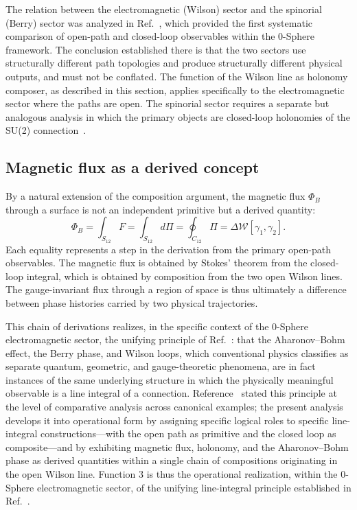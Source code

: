 \documentclass[%
 reprint, amsmath,amssymb, aps, prb, ]{revtex4-2}
\numberwithin{equation}{section}
\newcommand{\WL}{\mathcal{W}}
\begin{document}
The relation between the electromagnetic (Wilson) sector and the spinorial (Berry) sector was analyzed in Ref.~\cite{hanamura43}, which provided the first systematic comparison of open-path and closed-loop observables within the 0-Sphere framework. The conclusion established there is that the two sectors use structurally different path topologies and produce structurally different physical outputs, and must not be conflated. The function of the Wilson line as holonomy composer, as described in this section, applies specifically to the electromagnetic sector where the paths are open. The spinorial sector requires a separate but analogous analysis in which the primary objects are closed-loop holonomies of the SU(2) connection~\cite{hanamura45}.

\subsection{Magnetic flux as a derived concept}

By a natural extension of the composition argument, the magnetic flux $\Phi_B$ through a surface is not an independent primitive but a derived quantity:
\begin{equation}
\Phi_B = \int_{S_{12}} F = \int_{S_{12}} d\Pi = \oint_{C_{12}} \Pi = \Delta\WL[\gamma_1, \gamma_2].
\label{eq:flux_derived}
\end{equation}
Each equality represents a step in the derivation from the primary open-path observables. The magnetic flux is obtained by Stokes' theorem from the closed-loop integral, which is obtained by composition from the two open Wilson lines. The gauge-invariant flux through a region of space is thus ultimately a difference between phase histories carried by two physical trajectories.

This chain of derivations realizes, in the specific context of the 0-Sphere electromagnetic sector, the unifying principle of Ref.~\cite{hanamura31}: that the Aharonov--Bohm effect, the Berry phase, and Wilson loops, which conventional physics classifies as separate quantum, geometric, and gauge-theoretic phenomena, are in fact instances of the same underlying structure in which the physically meaningful observable is a line integral of a connection. Reference~\cite{hanamura31} stated this principle at the level of comparative analysis across canonical examples; the present analysis develops it into operational form by assigning specific logical roles to specific line-integral constructions---with the open path as primitive and the closed loop as composite---and by exhibiting magnetic flux, holonomy, and the Aharonov--Bohm phase as derived quantities within a single chain of compositions originating in the open Wilson line. Function 3 is thus the operational realization, within the 0-Sphere electromagnetic sector, of the unifying line-integral principle established in Ref.~\cite{hanamura31}.
\end{document}
